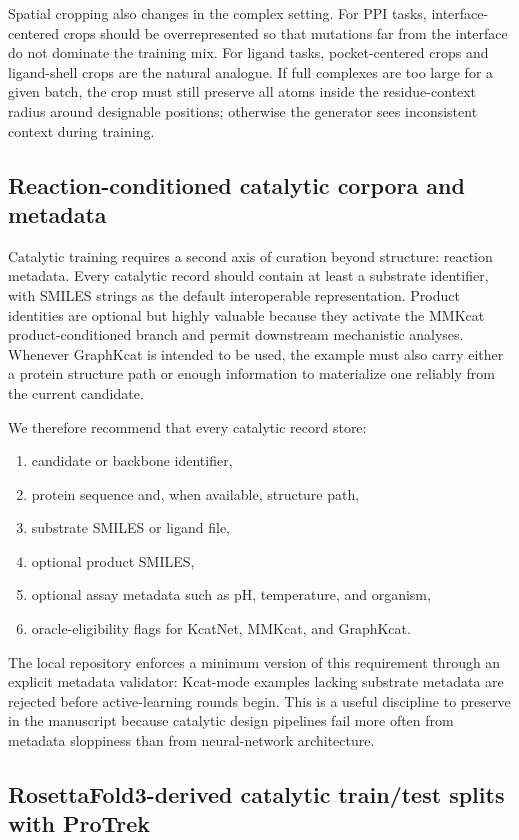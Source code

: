 \documentclass[11pt]{article}
\begin{document}
	Spatial cropping also changes in the complex setting. For PPI tasks, interface-centered crops should be overrepresented so that mutations far from the interface do not dominate the training mix. For ligand tasks, pocket-centered crops and ligand-shell crops are the natural analogue. If full complexes are too large for a given batch, the crop must still preserve all atoms inside the residue-context radius around designable positions; otherwise the generator sees inconsistent context during training.
	
	\subsection{Reaction-conditioned catalytic corpora and metadata}
	
	Catalytic training requires a second axis of curation beyond structure: reaction metadata. Every catalytic record should contain at least a substrate identifier, with SMILES strings as the default interoperable representation. Product identities are optional but highly valuable because they activate the MMKcat product-conditioned branch and permit downstream mechanistic analyses. Whenever GraphKcat is intended to be used, the example must also carry either a protein structure path or enough information to materialize one reliably from the current candidate.
	
	We therefore recommend that every catalytic record store:
	\begin{enumerate}[leftmargin=1.5em]
		\item candidate or backbone identifier,
		\item protein sequence and, when available, structure path,
		\item substrate SMILES or ligand file,
		\item optional product SMILES,
		\item optional assay metadata such as pH, temperature, and organism,
		\item oracle-eligibility flags for KcatNet, MMKcat, and GraphKcat.
	\end{enumerate}
	The local repository enforces a minimum version of this requirement through an explicit metadata validator: Kcat-mode examples lacking substrate metadata are rejected before active-learning rounds begin. This is a useful discipline to preserve in the manuscript because catalytic design pipelines fail more often from metadata sloppiness than from neural-network architecture.
	
	\subsection{RosettaFold3-derived catalytic train/test splits with ProTrek}
	
\end{document}
